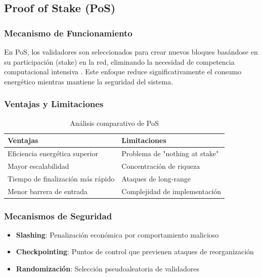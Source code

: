 \documentclass[spanish,12pt,letterpaper]{report}
\begin{document}
\subsection{Proof of Stake (PoS)}

\subsubsection{Mecanismo de Funcionamiento}

En PoS, los validadores son seleccionados para crear nuevos bloques basándose en su participación (stake) en la red, eliminando la necesidad de competencia computacional intensiva \cite{king2012ppcoin}. Este enfoque reduce significativamente el consumo energético mientras mantiene la seguridad del sistema.

\subsubsection{Ventajas y Limitaciones}

\begin{table}[h]
\centering
\begin{tabular}{|p{6cm}|p{6cm}|}
\hline
\textbf{Ventajas} & \textbf{Limitaciones} \\
\hline
Eficiencia energética superior & Problema de "nothing at stake" \\
Mayor escalabilidad & Concentración de riqueza \\
Tiempo de finalización más rápido & Ataques de long-range \\
Menor barrera de entrada & Complejidad de implementación \\
\hline
\end{tabular}
\caption{Análisis comparativo de PoS}
\label{tab:pos-comparison}
\end{table}

\subsubsection{Mecanismos de Seguridad}

\begin{itemize}
    \item \textbf{Slashing}: Penalización económica por comportamiento malicioso
    \item \textbf{Checkpointing}: Puntos de control que previenen ataques de reorganización
    \item \textbf{Randomización}: Selección pseudoaleatoria de validadores
\end{itemize}
\end{document}

